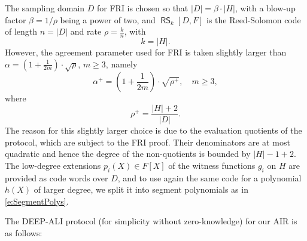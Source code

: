 \documentclass[11pt]{article}
\theoremstyle{definition}
\theoremstyle{remark}
\DeclareMathOperator{\RS}{\mathsf{RS}}
\begin{document}
The sampling domain $D$ for FRI is chosen so that $|D|=\beta\cdot |H|$, with a blow-up factor $\beta =1/\rho$ being a power of two, and $\RS_k[D,F]$ is the Reed-Solomon code of length $n= |D|$ and rate $\rho=\frac{k}{n}$, with
\begin{equation}
k = |H|.
\end{equation}
However, the agreement parameter used for FRI is taken slightly larger than $\alpha = \left(1+\frac{1}{2m}\right)\cdot\sqrt\rho$, $m\geq 3$, namely 
\begin{equation}
\alpha^+= \left(1+\frac{1}{2m}\right)\cdot \sqrt{\rho^+}, \quad m\geq 3, 
\end{equation}
where 
\begin{equation}
\rho^+=\frac{|H|+2}{|D|}.
\end{equation}
The reason for this slightly larger choice is due to the evaluation quotients of the protocol, which are subject to the FRI proof. 
Their denominators are at most quadratic and hence the degree of the non-quotients is bounded by $|H|-1 + 2$.
The low-degree extensions $p_i(X)\in F[X]$ of the witness functions $g_i$ on $H$ are provided as code words over $D$, and to use again the same code for a polynomial $h(X)$ of larger degree, we split it into segment polynomials as in \eqref{e:SegmentPolys}. 


The DEEP-ALI protocol (for simplicity without zero-knowledge) for our AIR is as follows: 
\end{document}
